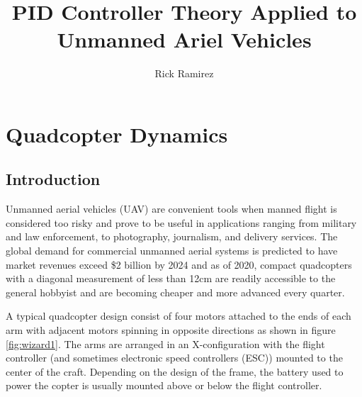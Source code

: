 \documentclass[11pt]{ucthesis}
\begin{document}

\title{PID Controller Theory Applied to Unmanned Ariel Vehicles}
\author{Rick Ramirez}
\chair{ }


\deanlineone{}
\deanlinetwo{}
\deanlinethree{}

\begin{frontmatter}

\maketitle


\tableofcontents
\listoffigures
\listoftables





\end{frontmatter}

\chapter{Quadcopter Dynamics}
\vspace{-1cm}
\section*{Introduction}
Unmanned aerial vehicles (UAV) are convenient tools when manned flight is considered too risky and prove to be useful in applications ranging from military and law enforcement, to photography, journalism, and delivery services. The global demand for commercial unmanned aerial systems is predicted to have market revenues exceed \$2 billion by 2024 \cite{foster2019} and as of 2020, compact quadcopters with a diagonal measurement of less than 12cm are readily accessible to the general hobbyist and are becoming cheaper and more advanced every quarter. 

A typical quadcopter design consist of four motors attached to the ends of each arm with adjacent motors spinning in opposite directions as shown in figure \ref{fig:wizard1}. The arms are arranged in an X-configuration with the flight controller (and sometimes electronic speed controllers (ESC)) mounted to the center of the craft. Depending on the design of the frame, the battery used to power the copter is usually mounted above or below the flight controller. 
\end{document}
